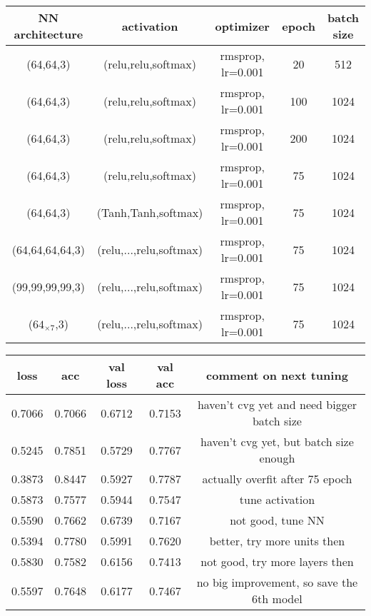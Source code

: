 \documentclass{article}
\begin{document}
\begin{center}
    \begin{tabular}{ccccc}\hline
        NN architecture & activation & optimizer & epoch & batch size \\ \hline
        (64,64,3) & (relu,relu,softmax) & rmsprop, lr=0.001 & 20 & 512\\
        (64,64,3) & (relu,relu,softmax) & rmsprop, lr=0.001 & 100 & 1024\\
        (64,64,3) & (relu,relu,softmax) & rmsprop, lr=0.001 & 200 & 1024\\
        (64,64,3) & (relu,relu,softmax) & rmsprop, lr=0.001 & 75 & 1024\\
        (64,64,3) & (Tanh,Tanh,softmax) & rmsprop, lr=0.001 & 75 & 1024\\
        (64,64,64,64,3) & (relu,...,relu,softmax) & rmsprop, lr=0.001 & 75 & 1024\\
        (99,99,99,99,3) & (relu,...,relu,softmax) & rmsprop, lr=0.001 & 75 & 1024\\
        ($64_{\times 7}$,3) & (relu,...,relu,softmax) & rmsprop, lr=0.001 & 75 & 1024\\
        \hline
    \end{tabular}
\end{center}
\begin{center}
    \begin{tabular}{ccccc}\hline
        loss & acc & val loss & val acc & comment on next tuning\\ \hline
        0.7066 & 0.7066 & 0.6712 & 0.7153 & haven't cvg yet and need bigger batch size\\
        0.5245 & 0.7851 & 0.5729 & 0.7767 & haven't cvg yet, but batch size enough\\
        0.3873 & 0.8447 & 0.5927 & 0.7787 & actually overfit after 75 epoch\\
        0.5873 & 0.7577 & 0.5944 & 0.7547 & tune activation\\
        0.5590 & 0.7662 & 0.6739 & 0.7167 & not good, tune NN\\
        0.5394 & 0.7780 & 0.5991 & 0.7620 & better, try more units then\\
        0.5830 & 0.7582 & 0.6156 & 0.7413 & not good, try more layers then\\
        0.5597 & 0.7648 & 0.6177 & 0.7467 & no big improvement, so save the 6th model\\
        \hline
    \end{tabular}
\end{center}
\end{document}
